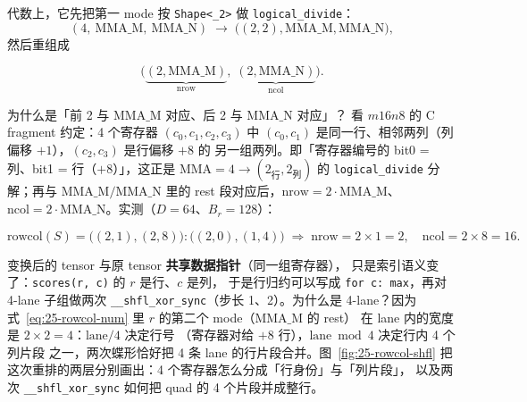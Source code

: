 

代数上，它先把第一 mode 按 \texttt{Shape<\_2>} 做
\texttt{logical\_\allowbreak{}divide}：
\[
  (4,\ \mathrm{MMA\_M},\ \mathrm{MMA\_N})
  \;\longrightarrow\;
  \bigl((2,2),\mathrm{MMA\_M},\mathrm{MMA\_N}\bigr),
\]
然后重组成

\begin{equation}
  \bigl(\underbrace{(2,\mathrm{MMA\_M})}_{\text{nrow}},\;
  \underbrace{(2,\mathrm{MMA\_N})}_{\text{ncol}}\bigr).
  \label{eq:25-rowcol}
\end{equation}

为什么是「前 2 与 $\mathrm{MMA\_M}$ 对应、后 2 与 $\mathrm{MMA\_N}$ 对应」？
看 $m16n8$ 的 C fragment 约定：4 个寄存器 $(c_0,c_1,c_2,c_3)$ 中
$(c_0,c_1)$ 是同一行、相邻两列（列偏移 $+1$），$(c_2,c_3)$ 是行偏移 $+8$ 的
另一组两列。即「寄存器编号的 bit0 = 列、bit1 = 行（$+8$）」，这正是
$\mathrm{MMA}=4 \to (2_{\text{行}},2_{\text{列}})$ 的
\texttt{logical\_\allowbreak{}divide} 分解；再与 $\mathrm{MMA\_M}/\mathrm{MMA\_N}$
里的 rest 段对应后，$\mathrm{nrow}=2\cdot \mathrm{MMA\_M}$、
$\mathrm{ncol}=2\cdot \mathrm{MMA\_N}$。实测（$D{=}64$、$B_r{=}128$）：

\begin{equation}
  \mathrm{rowcol}(S) = \bigl((2,1),(2,8)\bigr):\bigl((2,0),(1,4)\bigr)
  \;\Rightarrow\; \mathrm{nrow}=2\times1=2,\quad \mathrm{ncol}=2\times8=16 .
  \label{eq:25-rowcol-num}
\end{equation}

变换后的 tensor 与原 tensor \textbf{共享数据指针}（同一组寄存器），
只是索引语义变了：\texttt{scores(r, c)} 的 $r$ 是行、$c$ 是列，
于是行归约可以写成 \texttt{for c: max}，再对 4-lane 子组做两次
\texttt{\_\allowbreak{}\_\allowbreak{}shfl\_\allowbreak{}xor\_\allowbreak{}sync}（步长 1、2）。为什么是 4-lane？因为
式~\eqref{eq:25-rowcol-num} 里 $r$ 的第二个 mode（$\mathrm{MMA\_M}$ 的 rest）
在 lane 内的宽度是 $2\times2=4$：$\mathrm{lane}/4$ 决定行号
（寄存器对给 $+8$ 行），$\mathrm{lane}\bmod4$ 决定行内 4 个列片段
之一，两次蝶形恰好把 4 条 lane 的行片段合并。图~\ref{fig:25-rowcol-shfl}
把这次重排的两层分别画出：4 个寄存器怎么分成「行身份」与「列片段」，
以及两次 \texttt{\_\allowbreak{}\_\allowbreak{}shfl\_\allowbreak{}xor\_\allowbreak{}sync} 如何把 quad 的 4 个片段并成整行。

